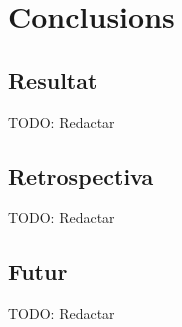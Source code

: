 
\chapter{Conclusions} %

\label{Chapter12} %


\section{Resultat}

TODO: Redactar


\section{Retrospectiva}

TODO: Redactar


\section{Futur}

TODO: Redactar